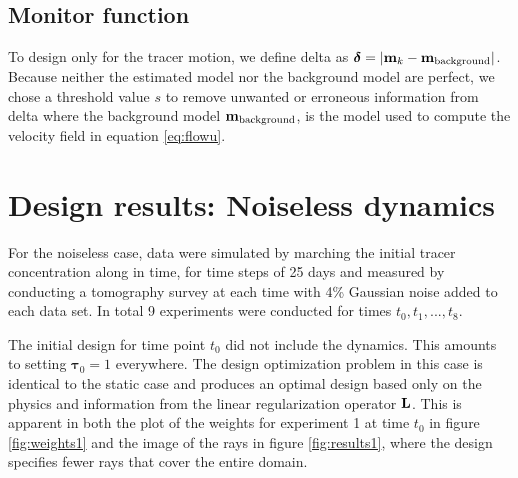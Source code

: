 \documentclass[11pt]{article}
\newcommand{\bfL}	{{\bf{L}}}
\newcommand{\bfm}	{{\bf{m}}}
\newcommand{\bftau}      {{\boldsymbol \tau}}
\newcommand{\bfdelta}	 { { \boldsymbol \delta} }
\begin{document}
\subsection{Monitor function}

To design only for the tracer motion, we define delta as $\bfdelta = |\bfm_{k} -\bfm_{\text{background}}|$. Because  neither the estimated model nor the background model are perfect, we  chose a threshold value $s$ to remove unwanted or erroneous information from delta 
where the background model $\bfm_{\text{background}} $, is the model used to compute the velocity field in equation \eqref{eq:flowu}.

\section{Design results: Noiseless dynamics}
\label{sec:Results}
For the noiseless case, data were simulated by marching  the initial tracer concentration along in time, for time steps of 25 days and measured by conducting a tomography survey at each time with 4\% Gaussian noise added to each data set. In total 9 experiments were conducted for times $t_0,t_1,...,t_8$. 


The initial design for time point $t_0$ did not include the dynamics. This amounts to  setting $\bftau_0 = 1$ everywhere. The design optimization problem in this case is  identical to the static case and produces an optimal design based only on the physics and information from the linear regularization operator $\bfL$. This is apparent in both the plot of the weights for experiment 1 at time  $t_0$ in figure \ref{fig:weights1} and the image of the rays in figure \ref{fig:results1}, where the design specifies fewer rays that cover the entire domain. 
\end{document}
